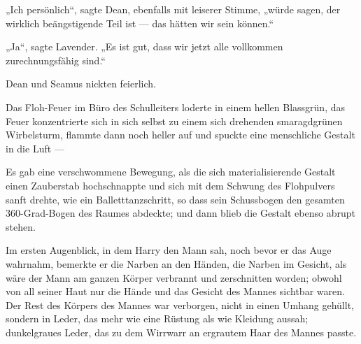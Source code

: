 „Ich persönlich“, sagte Dean, ebenfalls mit leiserer Stimme, „würde sagen, der wirklich beängstigende Teil ist — das hätten wir sein können.“

„Ja“, sagte Lavender.
„Es ist gut, dass wir jetzt alle vollkommen zurechnungsfähig sind.“

Dean und Seamus nickten feierlich.


Das Floh-Feuer im Büro des Schulleiters loderte in einem hellen Blassgrün, das Feuer konzentrierte sich in sich selbst zu einem sich drehenden smaragdgrünen Wirbelsturm, flammte dann noch heller auf und spuckte eine menschliche Gestalt in die Luft —

Es gab eine verschwommene Bewegung, als die sich materialisierende Gestalt einen Zauberstab hochschnappte und sich mit dem Schwung des Flohpulvers sanft drehte, wie ein Balletttanzschritt, so dass sein Schussbogen den gesamten 360-Grad-Bogen des Raumes abdeckte; und dann blieb die Gestalt ebenso abrupt stehen.

Im ersten Augenblick, in dem Harry den Mann sah, noch bevor er das Auge wahrnahm, bemerkte er die Narben an den Händen, die Narben im Gesicht, als wäre der Mann am ganzen Körper verbrannt und zerschnitten worden; obwohl von all seiner Haut nur die Hände und das Gesicht des Mannes sichtbar waren. Der Rest des Körpers des Mannes war verborgen, nicht in einen Umhang gehüllt, sondern in Leder, das mehr wie eine Rüstung als wie Kleidung aussah; dunkelgraues Leder, das zu dem Wirrwarr an ergrautem Haar des Mannes passte.

